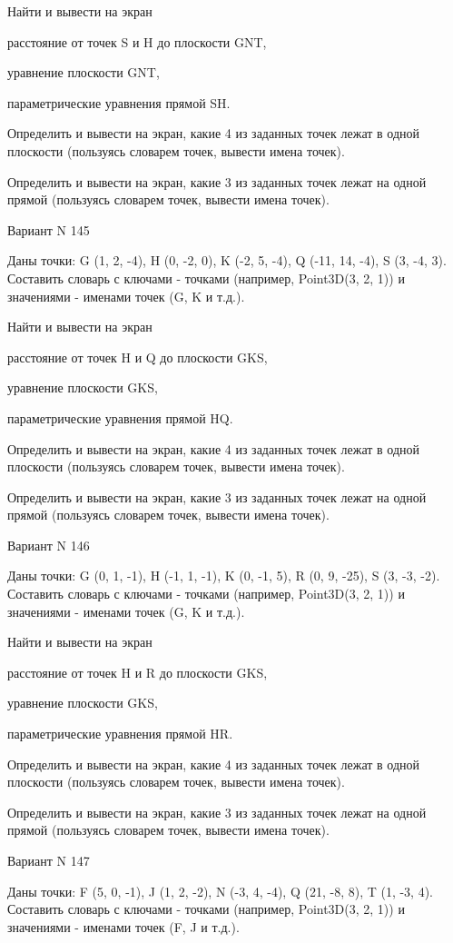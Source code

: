 \documentclass[11pt]{report}
\begin{document}
Найти и вывести на экран


расстояние от точек S и H до плоскости GNT,


уравнение плоскости GNT,


параметрические уравнения прямой SH.


Определить и вывести на экран, какие 4 из заданных точек лежат в одной плоскости (пользуясь словарем точек, вывести имена точек).


Определить и вывести на экран, какие 3 из заданных точек лежат на одной прямой (пользуясь словарем точек, вывести имена точек).

\newpage
Вариант N 145

Даны точки: G (1, 2, -4), H (0, -2, 0), K (-2, 5, -4), Q (-11, 14, -4), S (3, -4, 3).
Составить словарь с ключами - точками (например, Point3D(3, 2, 1)) и значениями - именами точек (G, K и т.д.).


Найти и вывести на экран


расстояние от точек H и Q до плоскости GKS,


уравнение плоскости GKS,


параметрические уравнения прямой HQ.


Определить и вывести на экран, какие 4 из заданных точек лежат в одной плоскости (пользуясь словарем точек, вывести имена точек).


Определить и вывести на экран, какие 3 из заданных точек лежат на одной прямой (пользуясь словарем точек, вывести имена точек).

\newpage
Вариант N 146

Даны точки: G (0, 1, -1), H (-1, 1, -1), K (0, -1, 5), R (0, 9, -25), S (3, -3, -2).
Составить словарь с ключами - точками (например, Point3D(3, 2, 1)) и значениями - именами точек (G, K и т.д.).


Найти и вывести на экран


расстояние от точек H и R до плоскости GKS,


уравнение плоскости GKS,


параметрические уравнения прямой HR.


Определить и вывести на экран, какие 4 из заданных точек лежат в одной плоскости (пользуясь словарем точек, вывести имена точек).


Определить и вывести на экран, какие 3 из заданных точек лежат на одной прямой (пользуясь словарем точек, вывести имена точек).

\newpage
Вариант N 147

Даны точки: F (5, 0, -1), J (1, 2, -2), N (-3, 4, -4), Q (21, -8, 8), T (1, -3, 4).
Составить словарь с ключами - точками (например, Point3D(3, 2, 1)) и значениями - именами точек (F, J и т.д.).
\end{document}
